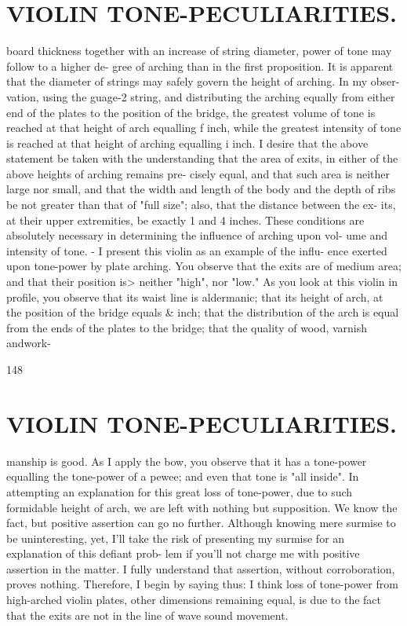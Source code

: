 \documentclass{article}
\begin{document}
\section*{VIOLIN TONE-PECULIARITIES.}
board thickness together with an increase of string diameter, power of tone may follow to a higher de- gree of arching than in the first proposition. It is apparent that the diameter of strings may safely govern the height of arching. In my obser- vation, using the guage-2 string, and distributing the arching equally from either end of the plates to the position of the bridge, the greatest volume of tone is reached at that height of arch equalling f inch, while the greatest intensity of tone is reached at that height of arching equalling i inch. I desire that the above statement be taken with the understanding that the area of exits, in either of the above heights of arching remains pre- cisely equal, and that such area is neither large nor small, and that the width and length of the body and the depth of ribs be not greater than that of "full size"; also, that the distance between the ex- its, at their upper extremities, be exactly 1 and 4 inches. These conditions are absolutely necessary in determining the influence of arching upon vol- ume and intensity of tone. - I present this violin as an example of the influ- ence exerted upon tone-power by plate arching. You observe that the exits are of medium area; and that their position is> neither "high", nor "low." As you look at this violin in profile, you observe that its waist line is aldermanic; that its height of arch, at the position of the bridge equals \& inch; that the distribution of the arch is equal from the ends of the plates to the bridge; that the quality of wood, varnish andwork-

148

\section*{VIOLIN TONE-PECULIARITIES.}
manship is good. As I apply the bow, you observe that it has a tone-power equalling the tone-power of a pewee; and even that tone is "all inside". In attempting an explanation for this great loss of tone-power, due to such formidable height of arch, we are left with nothing but supposition. We know the fact, but positive assertion can go no further. Although knowing mere surmise to be uninteresting, yet, I'll take the risk of presenting my surmise for an explanation of this defiant prob- lem if you'll not charge me with positive assertion in the matter. I fully understand that assertion, without corroboration, proves nothing. Therefore, I begin by saying thus: I think loss of tone-power from high-arched violin plates, other dimensions remaining equal, is due to the fact that the exits are not in the line of wave sound movement.
\end{document}
